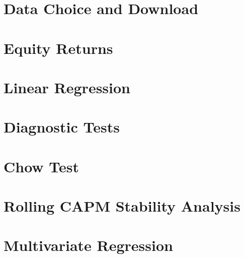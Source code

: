 \documentclass[12pt, openright, oneside]{report}
\begin{document}
\chapter{Data Choice and Download}
\label{chapter:download}

\chapter{Equity Returns}\label{chapter:equity_returns}


\chapter{Linear Regression}\label{chapter:linear_regression}


\chapter{Diagnostic Tests}\label{chapter:diagnostic_tests}


\chapter{Chow Test}\label{chapter:chow_test}


\chapter{Rolling CAPM Stability Analysis}\label{chapter:rolling}


\chapter{Multivariate Regression}\label{chapter:multivariate}

\end{document}
